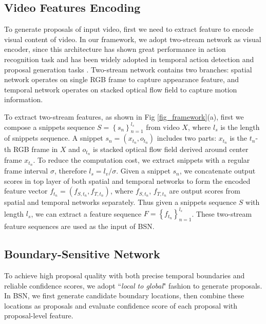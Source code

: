 \documentclass[runningheads]{llncs}
\begin{document}
\subsection{Video Features Encoding}

To generate proposals of input video, first we need to extract feature to encode visual content of video. 
In our framework, we adopt two-stream network \cite{simonyan2014two} as visual encoder, since this architecture has shown great performance in action recognition task \cite{wang2016temporal} and has been widely adopted in temporal action detection and proposal generation tasks \cite{zhao2017temporal,ssad,gao2017cascaded}.
Two-stream network contains two branches: spatial network  operates on single RGB frame to capture appearance feature, and temporal network operates on stacked optical flow field to capture motion information.

To extract two-stream features, as shown in Fig \ref{fig_framework}(a), first we compose a snippets sequence $S=\left \{ s_n \right \}_{n=1}^{l_s}$ from video $X$, where $l_s$ is the length of snippets sequence.  A snippet $s_n=(x_{t_n}, o_{t_n})$ includes two parts: $x_{t_n}$ is the $t_n$-th RGB frame in $X$ and $o_{t_n}$ is stacked optical flow field derived around center frame $x_{t_n}$. 
To reduce the computation cost, we extract snippets with a regular frame interval $\sigma $, therefore  $l_s=l_v/\sigma$.
Given a snippet $s_n$, we concatenate output scores in top layer of both spatial and temporal networks to form the encoded feature vector $f_{t_n}=(f_{S,t_n},f_{T,t_n})$, where $f_{S,t_n}$, $f_{T,t_n}$ are output scores from spatial and temporal networks separately.  
Thus given a snippets sequence $S$ with length $l_s$, we can extract a feature sequence $F=\left \{ f_{t_n} \right \}_{n=1}^{l_s}$. These two-stream feature sequences are used as the input of BSN.



\subsection{Boundary-Sensitive Network}

To achieve high proposal quality with both precise temporal boundaries and reliable confidence scores, we adopt ``\emph{local to global}" fashion to generate proposals. In BSN, we first generate candidate boundary locations, then combine these locations as proposals and evaluate confidence score of each proposal with proposal-level feature.   
\end{document}
